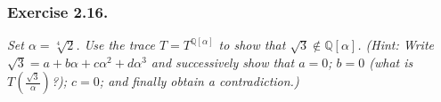 \documentclass{article}
\begin{document}



\subsubsection*{Exercise 2.16.}
\emph{Set $\alpha = \sqrt[4]{2}$.
Use the trace $T = T^{\mathbb{Q}[\alpha]}$ to show that $\sqrt{3} \not\in \mathbb{Q}[\alpha]$.
(Hint: Write $\sqrt{3} = a + b\alpha + c\alpha^2 + d\alpha^3$ and successively show that
$a = 0$; $b = 0$ (what is $T\left( \frac{\sqrt{3}}{\alpha} \right)$?); $c = 0$;
and finally obtain a contradiction.)} \\
\end{document}
